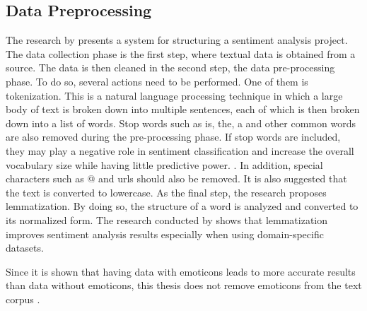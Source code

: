 \documentclass[11pt, a4paper]{article}
\begin{document}
\subsection{Data Preprocessing} \label{subs:datapreprocessing}
The research by \cite{jemai2021SentimentAnalysis} presents a system for structuring a sentiment analysis project. 
The data collection phase is the first step, where textual data is obtained from a source. 
The data is then cleaned in the second step, the data pre-processing phase. To do so, several actions need to be performed.
One of them is tokenization. This is a natural language processing technique in which a large body of text is broken down into multiple sentences, 
each of which is then broken down into a list of words. Stop words such as is, the, a and other common words are also removed during the 
pre-processing phase. If stop words are included, they may play a negative role in sentiment classification and increase the overall 
vocabulary size while having little predictive power. \citep{zhao2017comparisontextprocess}.
In addition, special characters such as @ and urls should also be removed. 
It is also suggested that the text is converted to lowercase. As the final step, the research proposes lemmatization. By doing so,
the structure of a word is analyzed and converted to its normalized form. The research conducted by \cite{camachocollados2018role} 
shows that lemmatization improves sentiment analysis results especially when using domain-specific datasets.

Since it is shown that having data with emoticons leads to more accurate results than data without emoticons,
this thesis does not remove emoticons from the text corpus \citep{parveen2016sentimentanalysistwitter}.
\end{document}
